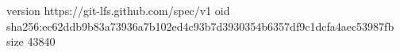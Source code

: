 version https://git-lfs.github.com/spec/v1
oid sha256:ec62ddb9b83a73936a7b102ed4c93b7d3930354b6357df9c1dcfa4aec53987fb
size 43840
